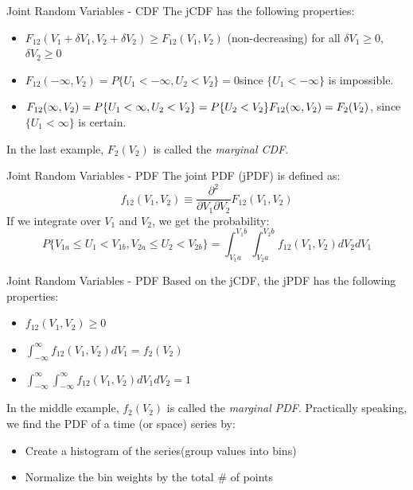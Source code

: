
\begin{frame}{Joint Random Variables - CDF}
  The jCDF has the following properties:
  
  \begin{itemize}
  	\item $F_{12}(V_1 + \delta V_1, V_2 + \delta V_2) \geq F_{12}(V_1, V_2)$ (non-decreasing) \newline for all $\delta V_1\geq0$, $\delta V_2\geq0$\newline
  	\item $F_{12}(-\infty,V_2) = P\{U_1<-\infty,U_2<V_2\} = 0$\newline since $\{U_1 < -\infty\}$ is impossible.\newline
  	\item $F_{12}(\infty,V_2) = P\{U_1<\infty,U_2<V_2\} = P\{U_2<V_2\}\newline F_{12}(\infty,V_2) = F_2(V_2)$, since $\{U_1 < \infty\}$ is certain.\newline
  \end{itemize}

  In the last example, $F_2(V_2)$ is called the \textit{marginal CDF}.
\end{frame}


\begin{frame}{Joint Random Variables - PDF}
  The joint PDF (jPDF) is defined as:
  $$f_{12}(V_1, V_2) \equiv \frac{\partial^2}{\partial V_1 \partial V_2}F_{12}(V_1,V_2)$$
  If we integrate over $V_1$ and $V_2$, we get the probability:
  $$P\{V_{1a} \leq U_1 < V_{1b}, V_{2a} \leq U_2 < V_{2b}\} = \int^{V_1b}_{V_1a} \int^{V_2b}_{V_2a} f_{12}(V_1,V_2)dV_2dV_1$$
  
\end{frame}


\begin{frame}{Joint Random Variables - PDF}
  Based on the jCDF, the jPDF has the following properties:
  \begin{itemize}
  	\item $f_{12} (V_1,V_2) \geq 0$\newline
  	\item $\int^{\infty}_{-\infty} f_{12}(V_1,V_2)dV_1 = f_2(V_2)$\newline
  	\item $\int^{\infty}_{-\infty} \int^{\infty}_{-\infty} f_{12}(V_1,V_2)dV_1dV_2 = 1$\newline
  \end{itemize}
  
  In the middle example, $f_2(V_2)$ is called the \textit{marginal PDF}. Practically speaking, we find the PDF of a time (or space) series by:
  \begin{itemize}
  	\item Create a histogram of the series(group values into bins)
  	\item Normalize the bin weights by the total \# of points
  \end{itemize}
\end{frame}

